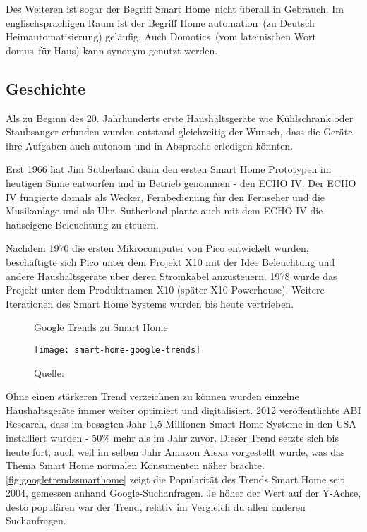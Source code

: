 Des Weiteren ist sogar der Begriff \glqq Smart Home\grqq \ nicht überall in Gebrauch. Im englischsprachigen Raum ist der Begriff \glqq Home automation\grqq \ (zu Deutsch \glqq Heimautomatisierung\grqq ) geläufig.
Auch \glqq Domotics\grqq \ (vom lateinischen Wort \glqq domus\grqq \ für \glqq Haus\grqq ) kann synonym genutzt werden.

\subsection{Geschichte}

Als zu Beginn des 20. Jahrhunderts erste Haushaltsgeräte wie Kühlschrank oder Staubsauger erfunden wurden entstand gleichzeitig der Wunsch, dass die Geräte ihre Aufgaben auch autonom und in Absprache erledigen könnten.

Erst 1966 hat Jim Sutherland dann den ersten Smart Home Prototypen im heutigen Sinne entworfen und in Betrieb genommen - den \ac{ECHO} IV.
Der \ac{ECHO} IV fungierte damals als Wecker, Fernbedienung für den Fernseher und die Musikanlage und als Uhr.
Sutherland plante auch mit dem \ac{ECHO} IV die hauseigene Beleuchtung zu steuern.

Nachdem 1970 die ersten Mikrocomputer von Pico entwickelt wurden, beschäftigte sich Pico unter dem Projekt X10 mit der Idee Beleuchtung und andere Haushaltsgeräte über deren Stromkabel anzusteuern.
1978 wurde das Projekt unter dem Produktnamen X10 (später X10 Powerhouse).
Weitere Iterationen des Smart Home Systems wurden bis heute vertrieben.

\begin{figure}[ht]
	\centering
	\caption{Google Trends zu Smart Home}
	\texttt{[image: smart-home-google-trends]}
	\caption*{\footnotesize{Quelle: }}
	\label{fig:googletrendssmarthome}
\end{figure}

Ohne einen stärkeren Trend verzeichnen zu können wurden einzelne Haushaltsgeräte immer weiter optimiert und digitalisiert.
2012 veröffentlichte ABI Research, dass im besagten Jahr 1,5 Millionen Smart Home Systeme in den USA installiert wurden - 50\% mehr als im Jahr zuvor.
Dieser Trend setzte sich bis heute fort, auch weil im selben Jahr Amazon Alexa vorgestellt wurde, was das Thema Smart Home normalen Konsumenten näher brachte.
\autoref{fig:googletrendssmarthome} zeigt die Popularität des Trends Smart Home seit 2004, gemessen anhand Google-Suchanfragen.
Je höher der Wert auf der Y-Achse, desto populären war der Trend, relativ im Vergleich du allen anderen Suchanfragen.

